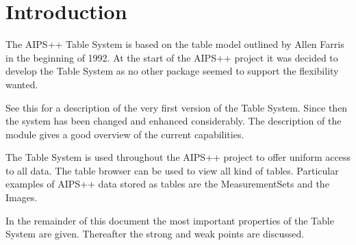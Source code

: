 \section{Introduction}
The AIPS++ Table System is based on the table model outlined
by Allen Farris in the beginning of 1992. At the start of the AIPS++
project it was decided to develop the Table System as no other package
seemed to support the flexibility wanted.

See this 
for a description of the very first version of the Table System.
Since then the system has been changed and enhanced considerably.
The description of the
module gives a good overview of the current capabilities.

The Table System is used throughout the AIPS++ project to offer
uniform access to all data. The table browser can be used to view
all kind of tables.
Particular examples of AIPS++ data stored
as tables are the MeasurementSets and the Images.

In the remainder of this document the most important properties of the
Table System are given. Thereafter the strong and weak points are
discussed. 


